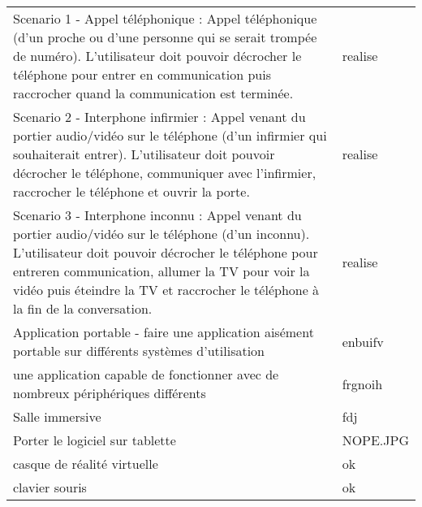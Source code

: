 \begin{tabular}{ll}
	Scenario 1 - Appel téléphonique : Appel téléphonique (d'un proche ou d'une personne qui se serait trompée de numéro). L'utilisateur doit pouvoir décrocher le téléphone pour entrer en communication puis raccrocher quand la communication est terminée. & realise \\
	Scenario 2 - Interphone infirmier : Appel venant du portier audio/vidéo sur le téléphone (d'un infirmier qui souhaiterait entrer). L'utilisateur doit pouvoir décrocher le téléphone, communiquer avec l'infirmier, raccrocher le téléphone et ouvrir la porte.& realise \\
	Scenario 3 - Interphone inconnu : Appel venant du portier audio/vidéo sur le téléphone (d'un inconnu). L'utilisateur doit pouvoir décrocher le téléphone pour entreren communication, allumer la TV pour voir la vidéo puis éteindre la TV et raccrocher le téléphone à la fin de la conversation.& realise \\
	Application portable - faire une application aisément portable sur différents systèmes d'utilisation & enbuifv \\
	une application capable de fonctionner avec de nombreux périphériques différents & frgnoih \\
	Salle immersive & fdj \\
	Porter le logiciel sur tablette  & NOPE.JPG \\
	casque de réalité virtuelle & ok \\
	clavier souris & ok \\
	
\end{tabular}
